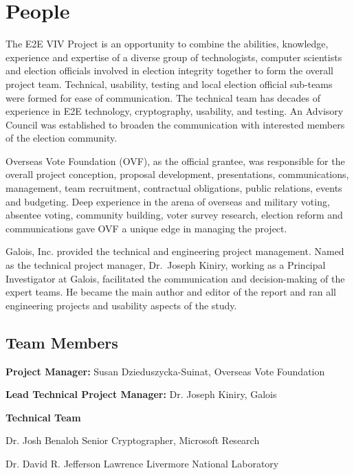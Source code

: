 \section{People}
\label{sec:people}

The E2E VIV Project is an opportunity to combine the abilities,
knowledge, experience and expertise of a diverse group of
technologists, computer scientists and election officials involved in
election integrity together to form the overall project
team. Technical, usability, testing and local election official
sub-teams were formed for ease of communication. The technical team
has decades of experience in E2E technology, cryptography, usability,
and testing. An Advisory Council was established to broaden the
communication with interested members of the election community.

Overseas Vote Foundation (OVF), as the official grantee, was
responsible for the overall project conception, proposal development,
presentations, communications, management, team recruitment,
contractual obligations, public relations, events and budgeting. Deep
experience in the arena of overseas and military voting, absentee
voting, community building, voter survey research, election reform and
communications gave OVF a unique edge in managing the project.

Galois, Inc. provided the technical and engineering project
management. Named as the technical project manager, Dr.~Joseph Kiniry,
working as a Principal Investigator at Galois, facilitated the
communication and decision-making of the expert teams. He became the
main author and editor of the report and ran all engineering projects
and usability aspects of the study.

\subsection{Team Members}
\label{sec:team-members}

\textbf{Project Manager:} Susan Dzieduszycka-Suinat, Overseas Vote Foundation

\textbf{Lead Technical Project Manager:} Dr. Joseph Kiniry, Galois

\textbf{Technical Team}

Dr. Josh Benaloh
Senior Cryptographer, Microsoft Research
 
Dr. David R. Jefferson
Lawrence Livermore National Laboratory
 
